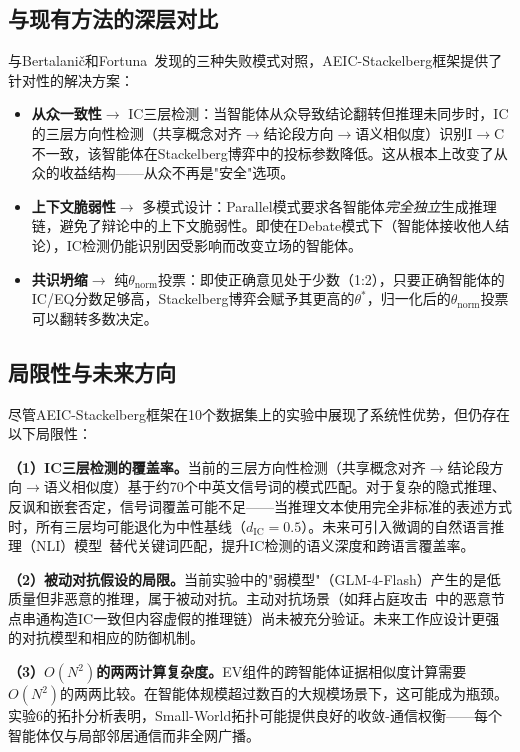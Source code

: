 \documentclass[12pt,a4paper,UTF8,fontset=fandol]{ctexart}
\begin{document}
\subsection{与现有方法的深层对比}

与Bertalani\v{c}和Fortuna~\cite{bertalanic2026cost}发现的三种失败模式对照，AEIC-Stackelberg框架提供了针对性的解决方案：

\begin{itemize}[nosep]
    \item \textbf{从众一致性}$\to$ IC三层检测：当智能体从众导致结论翻转但推理未同步时，IC的三层方向性检测（共享概念对齐$\to$结论段方向$\to$语义相似度）识别I$\to$C不一致，该智能体在Stackelberg博弈中的投标参数降低。这从根本上改变了从众的收益结构——从众不再是"安全"选项。
    \item \textbf{上下文脆弱性}$\to$ 多模式设计：Parallel模式要求各智能体\textit{完全独立}生成推理链，避免了辩论中的上下文脆弱性。即使在Debate模式下（智能体接收他人结论），IC检测仍能识别因受影响而改变立场的智能体。
    \item \textbf{共识坍缩}$\to$ 纯$\theta_{\text{norm}}$投票：即使正确意见处于少数（1:2），只要正确智能体的IC/EQ分数足够高，Stackelberg博弈会赋予其更高的$\theta^*$，归一化后的$\theta_{\text{norm}}$投票可以翻转多数决定。
\end{itemize}

\subsection{局限性与未来方向}

尽管AEIC-Stackelberg框架在10个数据集上的实验中展现了系统性优势，但仍存在以下局限性：

\textbf{（1）IC三层检测的覆盖率。}当前的三层方向性检测（共享概念对齐$\to$结论段方向$\to$语义相似度）基于约70个中英文信号词的模式匹配。对于复杂的隐式推理、反讽和嵌套否定，信号词覆盖可能不足——当推理文本使用完全非标准的表述方式时，所有三层均可能退化为中性基线（$d_{\text{IC}} = 0.5$）。未来可引入微调的自然语言推理（NLI）模型~\cite{reimers2019sentence}替代关键词匹配，提升IC检测的语义深度和跨语言覆盖率。

\textbf{（2）被动对抗假设的局限。}当前实验中的"弱模型"（GLM-4-Flash）产生的是低质量但非恶意的推理，属于被动对抗。主动对抗场景（如拜占庭攻击~\cite{olfati2007consensus}中的恶意节点串通构造IC一致但内容虚假的推理链）尚未被充分验证。未来工作应设计更强的对抗模型和相应的防御机制。

\textbf{（3）$O(N^2)$的两两计算复杂度。}EV组件的跨智能体证据相似度计算需要$O(N^2)$的两两比较。在智能体规模超过数百的大规模场景下，这可能成为瓶颈。实验6的拓扑分析表明，Small-World拓扑可能提供良好的收敛-通信权衡——每个智能体仅与局部邻居通信而非全网广播。
\end{document}
